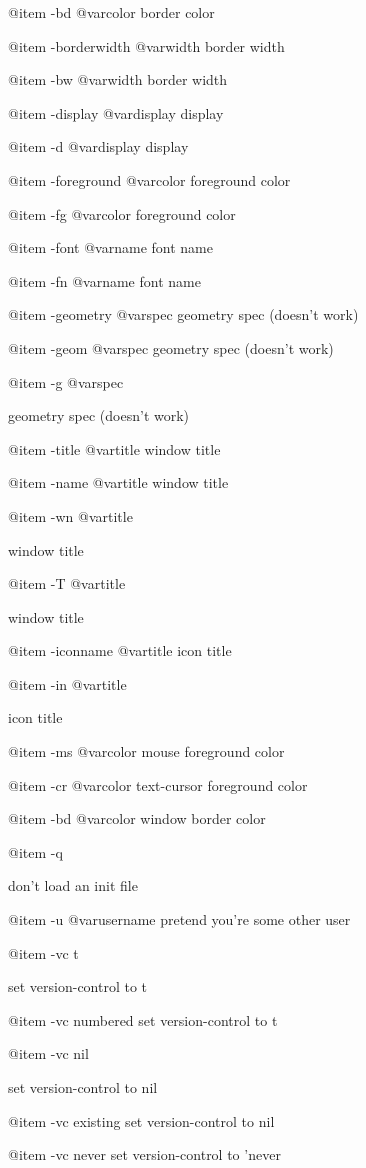 {{{@item -bd @var{color}
border color

@item -borderwidth @var{width}
border width

@item -bw @var{width}
border width

@item -display @var{display}
display

@item -d @var{display}
display

@item -foreground @var{color}
foreground color

@item -fg @var{color}
foreground color

@item -font @var{name}
font name

@item -fn @var{name}
font name

@item -geometry @var{spec}
geometry spec (doesn't work)

@item -geom @var{spec}
geometry spec (doesn't work)

@item -g @var{spec}

geometry spec (doesn't work)


@item -title @var{title}
window title

@item -name @var{title}
window title

@item -wn @var{title}

window title



@item -T @var{title}

window title


@item -iconname @var{title}
icon title

@item -in @var{title}

icon title


@item -ms @var{color}
mouse foreground color

@item -cr @var{color}
text-cursor foreground color

@item -bd @var{color}
window border color

@item -q

don't load an init file


@item -u @var{username}
pretend you're some other user

@item -vc t

set version-control to t


@item -vc numbered
set version-control to t

@item -vc nil

set version-control to nil


@item -vc existing
set version-control to nil

@item -vc never
set version-control to 'never

}}}

